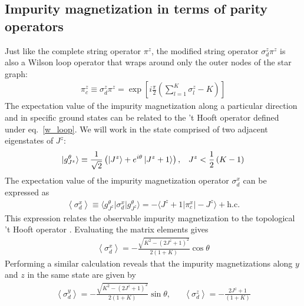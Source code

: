 \documentclass[reprint,prb,superscriptaddress]{revtex4-2}
\begin{document}
\subsection{Impurity magnetization in terms of parity operators}
Just like the complete string operator \(\pi^z\), the modified string operator \(\sigma_d^z \pi^z\) is also a Wilson loop operator that wraps around only the outer nodes of the star graph:
\begin{equation}\begin{aligned}
	\pi^z_c \equiv \sigma_d^z \pi^z = \exp\left[i \frac{\pi}{2} \left(\sum_{l=1}^K \sigma^z_l - K\right)\right] 
\end{aligned}\end{equation}
The expectation value of the impurity magnetization along a particular direction and in specific ground states can be related to the 't Hooft operator defined under eq.~\ref{w_loop}. We will work in the state comprised of two adjacent eigenstates of \(J^z\):
\begin{equation}\begin{aligned}
	\ket{g^\theta_{J^z}} \equiv \frac{1}{\sqrt 2}\left( \ket{J^z} + e^{i\theta}\ket{J^z+1}\right), && J^z < \frac{1}{2}\left( K-1 \right)
\end{aligned}\end{equation}
The expectation value of the impurity magnetization operator \(\sigma_d^x\) can be expressed as
\begin{equation}\begin{aligned}
	\left<\sigma_d^x\right> \equiv \langle g^\theta_{J^z} \vert \sigma_d^x \vert g^\theta_{J^z}\rangle = - \langle J^z + 1 \vert \pi^x_c \vert -J^z \rangle + \text{h.c.}
\end{aligned}\end{equation}
This expression relates the observable impurity magnetization to the topological 't Hooft operator \cite{Maric2020}. Evaluating the matrix elements gives
\begin{equation}\begin{aligned}
	\label{sigmax}
	\left<\sigma_d^x\right> = - \frac{\sqrt{K^2 - (2J^z + 1)^2}}{2(1+K)}\cos \theta
\end{aligned}\end{equation}
Performing a similar calculation reveals that the impurity magnetizations along \(y\) and \(z\) in the same state are given by
\begin{equation}\begin{aligned}
	\label{sigmayz}
	\left<\sigma_d^y\right> = - \frac{\sqrt{K^2 - (2J^z + 1)^2}}{2(1+K)}\sin \theta, &&\left<\sigma_d^z\right> = - \frac{2J^z + 1}{(1+K)}
\end{aligned}\end{equation}
\end{document}

